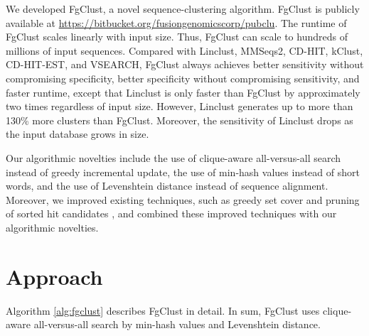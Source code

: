 \documentclass[11pt,letterpaper]{article}
\begin{document}
We developed FgClust, a novel sequence-clustering algorithm.
FgClust is publicly available at \url{https://bitbucket.org/fusiongenomicscorp/pubclu}.
The runtime of FgClust scales linearly with input size.
Thus, FgClust can scale to hundreds of millions of input sequences.
Compared with Linclust, MMSeqs2, CD-HIT, kClust, CD-HIT-EST, and VSEARCH, FgClust always achieves better sensitivity without compromising specificity, better specificity without compromising sensitivity, and faster runtime, except that Linclust is only faster than FgClust by approximately two times regardless of input size. 
However, Linclust generates up to more than 130\% more clusters than FgClust.
Moreover, the sensitivity of Linclust drops as the input database grows in size.

Our algorithmic novelties include the use of clique-aware all-versus-all search instead of greedy incremental update, the use of min-hash values instead of short words, and the use of Levenshtein distance instead of sequence alignment.
Moreover, we improved existing techniques, such as greedy set cover \cite{steinegger2017mmseqs2} and pruning of sorted hit candidates \cite{edgar2010search}, and combined these improved techniques with our algorithmic novelties.

\section{Approach}

Algorithm \ref{alg:fgclust} describes FgClust in detail. In sum, FgClust uses clique-aware all-versus-all search by min-hash values and Levenshtein distance.
\end{document}
